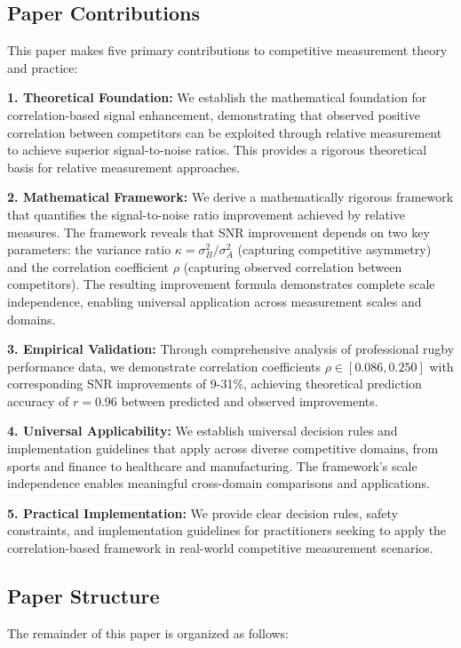 \subsection{Paper Contributions}

This paper makes five primary contributions to competitive measurement theory and practice:

\textbf{1. Theoretical Foundation:}
We establish the mathematical foundation for correlation-based signal enhancement, demonstrating that observed positive correlation between competitors can be exploited through relative measurement to achieve superior signal-to-noise ratios. This provides a rigorous theoretical basis for relative measurement approaches.

\textbf{2. Mathematical Framework:}
We derive a mathematically rigorous framework that quantifies the signal-to-noise ratio improvement achieved by relative measures. The framework reveals that SNR improvement depends on two key parameters: the variance ratio $\kappa = \sigma_B^2/\sigma_A^2$ (capturing competitive asymmetry) and the correlation coefficient $\rho$ (capturing observed correlation between competitors). The resulting improvement formula demonstrates complete scale independence, enabling universal application across measurement scales and domains.

\textbf{3. Empirical Validation:}
Through comprehensive analysis of professional rugby performance data, we demonstrate correlation coefficients $\rho \in [0.086, 0.250]$ with corresponding SNR improvements of 9-31\%, achieving theoretical prediction accuracy of $r = 0.96$ between predicted and observed improvements.

\textbf{4. Universal Applicability:}
We establish universal decision rules and implementation guidelines that apply across diverse competitive domains, from sports and finance to healthcare and manufacturing. The framework's scale independence enables meaningful cross-domain comparisons and applications.

\textbf{5. Practical Implementation:}
We provide clear decision rules, safety constraints, and implementation guidelines for practitioners seeking to apply the correlation-based framework in real-world competitive measurement scenarios.

\subsection{Paper Structure}

The remainder of this paper is organized as follows:

